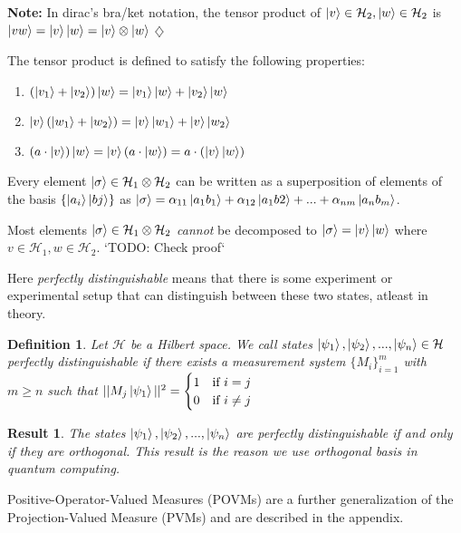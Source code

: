 \documentclass[12pt,twoside,fleqn]{report}
\theoremstyle{thmstyle}
\newtheorem{defn}{Definition}[chapter]
\newtheorem{result}{Result}[chapter]
\newenvironment{note}{\textbf{Note:}}{\hfill\ensuremath{\diamondsuit}}
\begin{document}
\begin{note}
    In dirac's bra/ket notation, the tensor product of $\ket{v} \in \mathcal{H}_2, \ket{w} \in \mathcal{H}_2$ is $\ket{vw} = \ket{v}\ket{w} = \ket{v} \otimes \ket{w}$
\end{note}

The tensor product is defined to satisfy the following properties:
\begin{enumerate}
    \item $(\ket{v_1} + \ket{v_2} ) \ket{w} = \ket{v_1}\ket{w} + \ket{v_2}\ket{w}$
    \item $\ket{v}(\ket{w_1} + \ket{w_2}) =  \ket{v}\ket{w_1} + \ket{v}\ket{w_2}$
    \item $(a \cdot \ket{v})\ket{w} = \ket{v}(a \cdot \ket{w})  = a \cdot (\ket{v}\ket{w})$
\end{enumerate}
Every element $\ket{\sigma} \in \mathcal{H}_1 \otimes \mathcal{H}_2$ can be written as a superposition of elements of the basis $\{ \ket{a_i}\ket{bj} \}$ as $\ket{\sigma} = \alpha_{11} \ket{a_1 b_1} + \alpha_{12} \ket{a_1 b2} + ... + \alpha_{nm} \ket{a_n b_m}$.

Most elements $\ket{\sigma} \in \mathcal{H}_1 \otimes \mathcal{H}_2$ \textit{cannot} be decomposed to $\ket{\sigma} = \ket{v}\ket{w}$ where $v \in \mathcal{H}_1, w \in \mathcal{H}_2$.
`TODO: Check proof`

Here \textit{perfectly distinguishable} means that there is some experiment or experimental setup that can distinguish between these two states, atleast in theory.

\begin{defn}
            Let $\mathcal{H}$ be a Hilbert space. We call states $\ket{\psi_1}, \ket{\psi_2}, ..., \ket{\psi_n} \in \mathcal{H}$ perfectly distinguishable if there exists a measurement system $\{ M_i \}_{i=1}^m$ with $m \geq n$ such that $|| M_j \ket{\psi_1} ||^2 = \begin{cases} 1 & \text{if } i = j \\ 0 & \text{if } i \neq j \end{cases}$
\end{defn}

\begin{result}
            The states $\ket{\psi_1}, \ket{\psi_2}, ..., \ket{\psi_n}$ are perfectly distinguishable if and only if they are orthogonal. This result is the reason we use orthogonal basis in quantum computing.
\end{result}

Positive-Operator-Valued Measures (POVMs) are a further generalization of the Projection-Valued Measure (PVMs) and are described in the appendix. 
\end{document}
